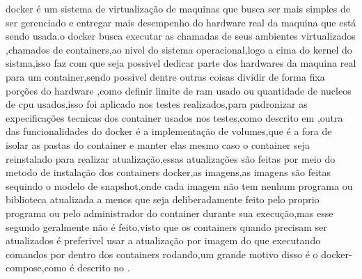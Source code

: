 \documentclass[
	12pt,				%
	openright,			%
	oneside,			%
	a4paper,			%
	english,			%
	french,				%
	spanish,			%
	brazil,				%
	]{abntex2}
\begin{document}
docker é um sistema de virtualização de maquinas que busca ser mais simples de ser gerenciado e entregar mais desempenho do hardware real da maquina que está sendo usada.o docker busca executar as chamadas de seus ambientes virtualizados ,chamados de containers,ao nivel do sistema operacional,logo a cima do kernel do sistma,isso faz com que seja possivel dedicar parte dos hardwares da maquina real para um container,sendo possivel dentre outras coisas dividir de forma fixa porções do hardware ,como definir limite de ram usado ou quantidade de nucleos de cpu usados,isso foi aplicado nos testes realizados,para padronizar as expecificações tecnicas dos container usados nos testes,como descrito em ,outra das funcionalidades do docker é a implementação de volumes,que é a fora de isolar as pastas do container e manter elas mesmo caso o container seja reinstalado para realizar atualização,essas atualizações são feitas por meio do metodo de instalação dos containers docker,as imagens,as imagens são feitas sequindo o modelo de snapshot,onde cada imagem não tem nenhum programa ou biblioteca atualizada a menos que seja deliberadamente feito pelo proprio programa ou pelo administrador do container durante sua execução,mas esse segundo geralmente não é feito,visto que os containers quando precisam ser atualizados é preferivel usar a atualização por imagem do que executando comandos por dentro dos containers rodando,um grande motivo disso é o docker-compose,como é descrito no .
\end{document}

